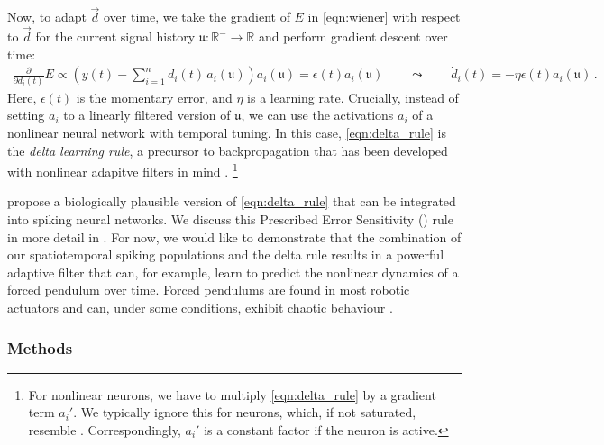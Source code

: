 Now, to adapt $\vec d$ over time, we take the gradient of $E$ in \cref{eqn:wiener} with respect to $\vec d$ for the current signal history $\mathfrak{u} : \mathbb{R}^- \longrightarrow \mathbb{R}$ and perform gradient descent over time:
\begin{align}
	\frac{\partial}{\partial d_i(t)} E \propto \left(y(t) - \sum\nolimits_{i = 1}^n d_i(t) \, a_i(\mathfrak{u}) \right) a_i(\mathfrak{u}) = \epsilon(t) a_i(\mathfrak{u}) \quad\quad \leadsto \quad\quad \dot{d}_i(t) = - \eta \epsilon(t) a_i(\mathfrak{u}) \,.
	\label{eqn:delta_rule}
\end{align}
Here, $\epsilon(t)$ is the momentary error, and $\eta$ is a learning rate.
Crucially, instead of setting $a_i$ to a linearly filtered version of $\mathfrak{u}$, we can use the activations $a_i$ of a nonlinear neural network with temporal tuning.
In this case, \cref{eqn:delta_rule} is the \emph{delta learning rule}, a precursor to back\-pro\-pa\-ga\-tion that has been developed with nonlinear adapitve filters in mind \citep{widrow1960adaptive}.%
\footnote{For nonlinear neurons, we have to multiply \cref{eqn:delta_rule} by a gradient term $a_i'$. We typically ignore this for \LIF neurons, which, if not saturated, resemble \ReLUpl. Correspondingly, $a_i'$ is a constant factor if the neuron is active.}

 propose a biologically plausible version of \cref{eqn:delta_rule} that can be integrated into spiking neural networks.
We discuss this Prescribed Error Sensitivity (\PES) rule in more detail in .
For now, we would like to demonstrate that the combination of our spatiotemporal spiking \NEF populations and the delta rule results in a powerful adaptive filter that can, for example, learn to predict the nonlinear dynamics of a forced pendulum over time.
Forced pendulums are found in most robotic actuators and can, under some conditions, exhibit chaotic behaviour \citep{hubbard1999forced}.

\subsubsection{Methods}

